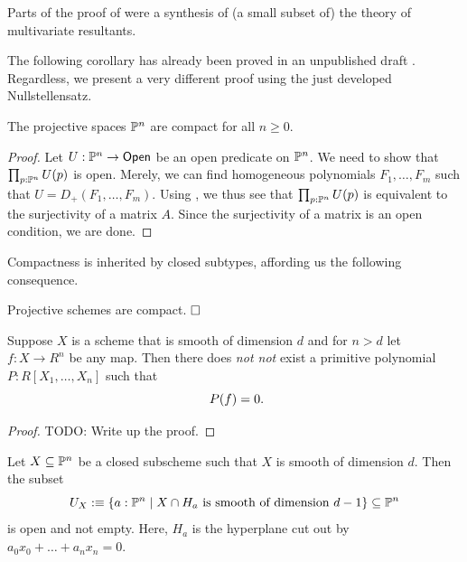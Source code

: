 Parts of the proof of  were a synthesis of (a small subset of) the theory of multivariate resultants.

The following corollary has already been proved in an unpublished draft \cite{proper-draft}.
Regardless, we present a very different proof using the just developed Nullstellensatz.

\begin{corollary}
  \label{P^n-compact}
  The projective spaces $\mathbb{P}^n$ are compact for all $n \geq 0$.
\end{corollary}

\begin{proof}
  Let $U : \mathbb{P}^n \to \mathsf{Open}$ be an open predicate on $\mathbb{P}^n$.
  We need to show that $\prod_{p:\mathbb{P}^n}U(p)$ is open.
  Merely, we can find homogeneous polynomials $F_1,\hdots,F_m$ such that $U = D_+(F_1,\hdots,F_m)$.
  Using , we thus see that $\prod_{p:\mathbb{P}^n}U(p)$ is equivalent to the surjectivity of a matrix $A$.
  Since the surjectivity of a matrix is an open condition, we are done.
\end{proof}

Compactness is inherited by closed subtypes, affording us the following consequence.

\begin{corollary}
  \label{projective-schemes-are-compact}
  Projective schemes are compact.
  $\hfill\square$
\end{corollary}

\begin{lemma}
  Suppose $X$ is a scheme that is smooth of dimension $d$ and for $n > d$ let $f : X \to R^n$ be any map.
  Then there does \emph{not not} exist a primitive polynomial $P : R[X_1, \hdots, X_n]$ such that
  \[
    P(f) = 0 \rlap{.}
  \]
\end{lemma}

\begin{proof}
  {\color{red}TODO: Write up the proof.}
\end{proof}

\begin{proposition}
  \label{weak-bertini}
Let $X \subseteq \mathbb{P}^n$ be a closed subscheme such that $X$ is smooth of dimension $d$.
Then the subset
\[
  U_X :\equiv \{ a : \mathbb{P}^n \;|\; X \cap H_a \text{ is smooth of dimension } d-1 \} \subseteq \mathbb{P}^n
\]
is open and not empty.
Here, $H_a$ is the hyperplane cut out by $a_0x_0+\hdots+a_nx_n=0$.
\end{proposition}

